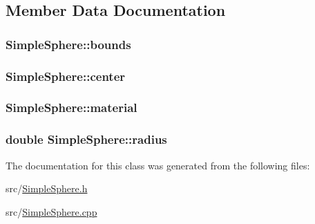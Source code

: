 \subsection{Member Data Documentation}
\subsubsection[{\texorpdfstring{bounds}{bounds}}]{ Simple\+Sphere\+::bounds\hspace{0.3cm}{\ttfamily [private]}}\hypertarget{classSimpleSphere_a9e528c29b08c4b70c8b707343576ec57}{}\label{classSimpleSphere_a9e528c29b08c4b70c8b707343576ec57}
\subsubsection[{\texorpdfstring{center}{center}}]{ Simple\+Sphere\+::center\hspace{0.3cm}{\ttfamily [private]}}\hypertarget{classSimpleSphere_af432089b8146295c77f52f22835bf1ab}{}\label{classSimpleSphere_af432089b8146295c77f52f22835bf1ab}
\subsubsection[{\texorpdfstring{material}{material}}]{ Simple\+Sphere\+::material\hspace{0.3cm}{\ttfamily [private]}}\hypertarget{classSimpleSphere_abfb049ac4dabb0c7fbb78d7791e33e42}{}\label{classSimpleSphere_abfb049ac4dabb0c7fbb78d7791e33e42}
\subsubsection[{\texorpdfstring{radius}{radius}}]{\setlength{\rightskip}{0pt plus 5cm}double Simple\+Sphere\+::radius\hspace{0.3cm}{\ttfamily [private]}}\hypertarget{classSimpleSphere_ad69dbac136ee99110f41b7b84656b144}{}\label{classSimpleSphere_ad69dbac136ee99110f41b7b84656b144}


The documentation for this class was generated from the following files\+:\begin{DoxyCompactItemize}
\item 
src/\hyperlink{SimpleSphere_8h}{Simple\+Sphere.\+h}\item 
src/\hyperlink{SimpleSphere_8cpp}{Simple\+Sphere.\+cpp}\end{DoxyCompactItemize}
